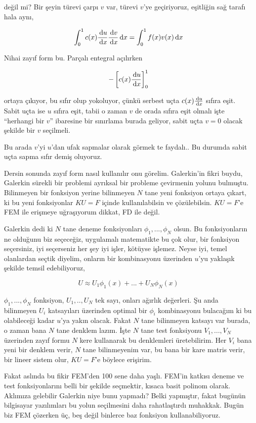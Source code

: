 \documentclass[12pt,fleqn]{article}\usepackage{../../common}
\begin{document}
değil mi? Bir şeyin türevi çarpı $v$ var, türevi $v$'ye geçiriyoruz, eşitliğin
sağ tarafı hala aynı,

$$
\int_{0}^{1} c(x) \frac{\,\mathrm{d} u}{\,\mathrm{d} x} \frac{\,\mathrm{d} v}{\,\mathrm{d} x} \,\mathrm{d} x =
\int_{0}^{1} f(x) v(x) \,\mathrm{d} x
$$

Nihai zayıf form bu. Parçalı entegral açılırken

$$
- \left[ c(x) \frac{\,\mathrm{d} u}{\,\mathrm{d} x}  \right]_{0}^{1}
$$

ortaya çıkıyor, bu sıfır olup yokoluyor, çünkü serbest uçta $c(x) \frac{\,\mathrm{d} u}{\,\mathrm{d} x}$
sıfıra eşit. Sabit uçta ise $u$ sıfıra eşit, tabii o zaman $v$ de orada sıfıra
eşit olmalı işte ``herhangi bir $v$'' ibaresine bir sınırlama burada geliyor,
sabit uçta $v=0$ olacak şekilde bir $v$ seçilmeli.

Bu arada $v$'yi $u$'dan ufak sapmalar olarak görmek te faydalı.. Bu durumda
sabit uçta sapma sıfır demiş oluyoruz.

Dersin sonunda zayıf form nasıl kullanılır onu görelim. Galerkin'in fikri buydu,
Galerkin sürekli bir problemi ayrıksal bir probleme çevirmenin yolunu bulmuştu.
Bilinmeyen bir fonksiyon yerine bilinmeyen $N$ tane yeni fonksiyon ortaya
çıkart, ki bu yeni fonksiyonlar $KU = F$ içinde kullanılabilsin ve çözülebilsin.
$KU=F$'e FEM ile erişmeye uğraşıyorum dikkat, FD ile değil.

Galerkin dedi ki $N$ tane deneme fonksiyonları $\phi_1,...,\phi_N$ olsun. Bu
fonksiyonların ne olduğunu biz seçeceğiz, uygulamalı matematikte bu çok olur,
bir fonksiyon seçersiniz, iyi seçerseniz her şey iyi işler, kötüyse işlemez.
Neyse iyi, temel olanlardan seçtik diyelim, onların bir kombinasyonu üzerinden
$u$'yu yaklaşık şekilde temsil edebiliyoruz,

$$
U \approx U_1 \phi_1(x) + ... + U_N \phi_N(x)
$$

$\phi_1,...,\phi_N$ fonksiyon, $U_1,..,U_N$ tek sayı, onları ağırlık değerleri.
Şu anda bilinmeyen $U_i$ katsayıları üzerinden optimal bir $\phi_i$ kombinasyonu
bulacağım ki bu olabileceği kadar $u$'ya yakın olacak. Fakat $N$ tane bilinmeyen
katsayı var burada, o zaman bana $N$ tane denklem lazım. İşte $N$ tane test
fonksiyonu $V_1,...,V_N$ üzerinden zayıf formu $N$ kere kullanarak bu
denklemleri üretebilirim. Her $V_i$ bana yeni bir denklem verir, $N$ tane
bilinmeyenim var, bu bana bir kare matris verir, bir lineer sistem olur, 
$KU = F$'e böylece erişirim.

Fakat aslında bu fikir FEM'den 100 sene daha yaşlı. FEM'in katkısı deneme ve
test fonksiyonlarını belli bir şekilde seçmektir, kısaca basit polinom
olarak. Aklımıza gelebilir Galerkin niye bunu yapmadı? Belki yapmıştır, fakat
bugünün bilgisayar yazılımları bu yolun seçilmesini daha rahatlaştırdı muhakkak.
Bugün biz FEM çözerken üç, beş değil binlerce baz fonksiyon kullanabiliyoruz.
\end{document}
